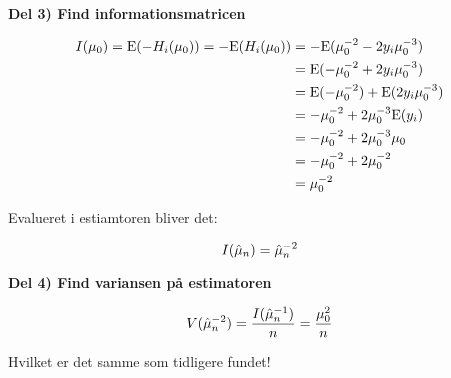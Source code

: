\textbf{Del 3) Find informationsmatricen}

\begin{align}
    I(\mu_0) = \text{E}(-H_i(\mu_0)) = - \text{E}(H_i(\mu_0)) &= - \text{E}(\mu_0^{-2} - 2 y_i \mu_0^{-3})\\
    &=\text{E}(-\mu_0^{-2} + 2 y_i \mu_0^{-3})\\
    &=\text{E}(-\mu_0^{-2}) + \text{E}(2 y_i \mu_0^{-3}) \\
    &= -\mu_0^{-2} + 2 \mu_0^{-3} \text{E}(y_i) \\
    &= -\mu_0^{-2} + 2 \mu_0^{-3} \mu_0 \\
    &= - \mu_0^{-2} + 2 \mu_0^{-2} \\
    &= \mu_0^{-2}
\end{align}

Evalueret i estiamtoren bliver det:

\begin{equation}
    I(\hat{\mu}_n) = \hat{\mu}_n^{-2}
\end{equation}

\textbf{Del 4) Find variansen på estimatoren}

\begin{equation}
    V(\hat{\mu}_n^{-2}) = \frac{I(\hat{\mu}_n^{-1})}{n} = \frac{\mu_0^2}{n}
\end{equation}

Hvilket er det samme som tidligere fundet!

